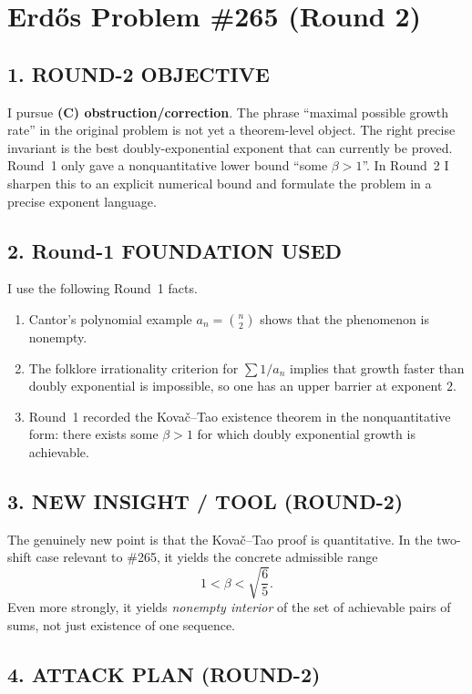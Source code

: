 \section*{Erd\H{o}s Problem \#265 (Round 2)}

\subsection*{1. ROUND-2 OBJECTIVE}

I pursue \textbf{(C) obstruction/correction}.  The phrase ``maximal possible growth rate'' in the original problem is not yet a theorem-level object.  The right precise invariant is the best doubly-exponential exponent that can currently be proved.  Round~1 only gave a nonquantitative lower bound ``some $\beta>1$''.  In Round~2 I sharpen this to an explicit numerical bound and formulate the problem in a precise exponent language.

\subsection*{2. Round-1 FOUNDATION USED}

I use the following Round~1 facts.

\begin{enumerate}
\item Cantor's polynomial example $a_n={n\choose 2}$ shows that the phenomenon is nonempty.
\item The folklore irrationality criterion for $\sum 1/a_n$ implies that growth faster than doubly exponential is impossible, so one has an upper barrier at exponent $2$.
\item Round~1 recorded the Kova\v c--Tao existence theorem in the nonquantitative form: there exists some $\beta>1$ for which doubly exponential growth is achievable.
\end{enumerate}

\subsection*{3. NEW INSIGHT / TOOL (ROUND-2)}

The genuinely new point is that the Kova\v c--Tao proof is quantitative.  In the two-shift case relevant to \#265, it yields the concrete admissible range
\[
1<\beta<\sqrt{\frac65}.
\]
Even more strongly, it yields \emph{nonempty interior} of the set of achievable pairs of sums, not just existence of one sequence.

\subsection*{4. ATTACK PLAN (ROUND-2)}

